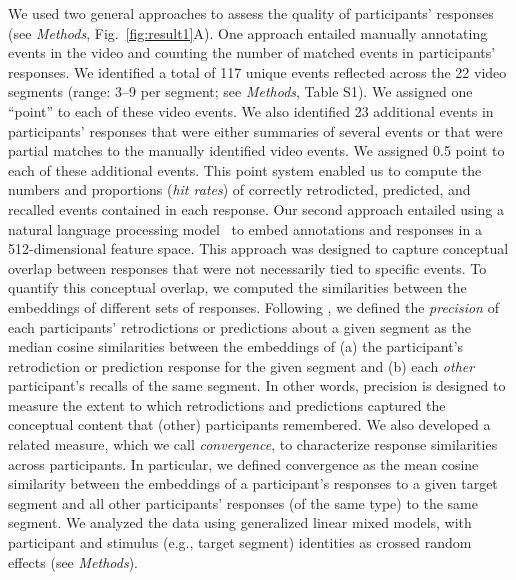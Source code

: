 \documentclass[10pt]{article}
\newcommand{\stimDescription}{S1} %
\begin{document}
We used two general approaches to assess the quality of participants' responses (see \textit{Methods}, Fig.~\ref{fig:result1}A).  One approach entailed manually annotating events in the video and counting the number of matched events in participants' responses.  We identified a total of 117 unique events reflected across the 22 video segments (range: 3--9 per segment; see \textit{Methods}, Table \stimDescription).  We assigned one ``point'' to each of these video events.  We also identified 23 additional events in participants' responses that were either summaries of several events or that were partial matches to the manually identified video events.  We assigned 0.5 point to each of these additional events.  This point system enabled us to compute the numbers and proportions (\textit{hit rates}) of correctly retrodicted, predicted, and recalled events contained in each response.  Our second approach entailed using a natural language processing model~\citep{CerEtal18} to embed annotations and responses in a 512-dimensional feature space.  This approach was designed to capture conceptual overlap between responses that were not necessarily tied to specific events.  To quantify this conceptual overlap, we computed the similarities between the embeddings of different sets of responses.  Following \cite{HeusEtal21}, we defined the \textit{precision} of each participants' retrodictions or predictions about a given segment as the median cosine similarities between the embeddings of (a) the participant's retrodiction or prediction response for the given segment and (b) each \textit{other} participant's recalls of the same segment.  In other words, precision is designed to measure the extent to which retrodictions and predictions captured the conceptual content that (other) participants remembered.  We also developed a related measure, which we call \textit{convergence}, to characterize response similarities across participants.  In particular, we defined convergence as the mean cosine similarity between the embeddings of a participant's responses to a given target segment and all other participants' responses (of the same type) to the same segment.  We analyzed the data using generalized linear mixed models, with participant and stimulus (e.g., target segment) identities as crossed random effects (see \textit{Methods}).
\end{document}
